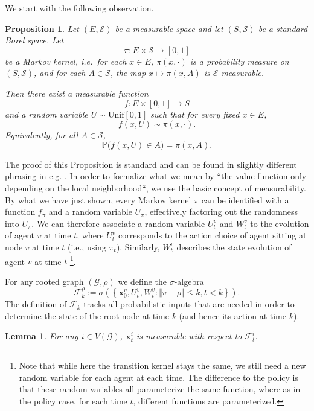 \documentclass{article}
\newtheorem{lemma}{Lemma}
\newtheorem{proposition}{Proposition}
\begin{document}
\label{app:proof_locality}
We start with the following observation.
\begin{proposition}
\label{prop:kernel-randomization}
Let $(E,\mathcal E)$ be a measurable space and let $(S,\mathcal S)$ be a standard
Borel space. Let
\[
\pi : E \times \mathcal S \to [0,1]
\]
be a Markov kernel, i.e.\ for each $x\in E$, $\pi(x,\cdot)$ is a probability
measure on $(S,\mathcal S)$, and for each $A\in\mathcal S$, the map
$x \mapsto \pi(x,A)$ is $\mathcal E$-measurable.

Then there exist a measurable function
\[
f : E \times [0,1] \to S
\]
and a random variable $U \sim \mathrm{Unif}[0,1]$ such that for every fixed
$x\in E$,
\[
f(x,U) \sim \pi(x,\cdot).
\]
Equivalently, for all $A \in \mathcal S$,
\[
\mathbb P\bigl(f(x,U) \in A\bigr) = \pi(x,A).
\]
\end{proposition}
The proof of this Proposition is standard and can be found in slightly different phrasing in e.g. \cite{kallenberg1997foundations}. In order to formalize what we mean by ``the value function only depending on the local neighborhood``, we use the basic concept of measurability. By what we have just shown, every Markov kernel $\pi$ can be identified with a function $f_\pi$ and a random variable $U_\pi$, effectively factoring out the randomness into $U_\pi$. We can therefore associate a random variable $U_t ^v$ and $W_t ^v$ to the evolution of agent $v$ at time $t$, where $U_t ^v$ corresponds to the action choice of agent sitting at node $v$ at time $t$ (i.e., using $\pi_t$). Similarly, $W_t ^v$ describes the state evolution of agent $v$ at time $t$ \footnote{Note that while here the transition kernel stays the same, we still need a new random variable for each agent at each time. The difference to the policy is that these random variables all parameterize the same function, where as in the policy case, for each time $t$, different functions are parameterized.}.

For any rooted graph $(\mathcal G, \rho)$ we define the $\sigma$-algebra
$$\mathcal F_k ^\rho := \sigma \left( \left\{ \mathbf x_0 ^v, U_t ^v, W_t ^v : \Vert v - \rho \Vert \le k, t < k\right\} \right).$$
The definition of $\mathcal F_k$ tracks all probabilistic inputs that are needed in order to determine the state of the root node at time $k$ (and hence its action at time $k$).

\begin{lemma}
    \label{lemma:action_is_local}
    For any $i \in V(\mathcal G)$, $\mathbf x^i _t$ is measurable with respect to $\mathcal F_{t} ^i$.
\end{lemma}
\end{document}
